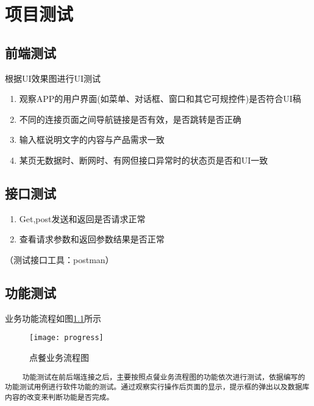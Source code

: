 
\chapter{项目测试}

\section{前端测试}

根据UI效果图进行UI测试
\begin{enumerate}
\item 观察APP的用户界面(如菜单、对话框、窗口和其它可规控件)是否符合UI稿
\item 不同的连接页面之间导航链接是否有效，是否跳转是否正确
\item 输入框说明文字的内容与产品需求一致
\item 某页无数据时、断网时、有网但接口异常时的状态页是否和UI一致
\end{enumerate}

\section{接口测试}
\begin{enumerate}
\item Get,post发送和返回是否请求正常
\item 查看请求参数和返回参数结果是否正常
\end{enumerate}
（测试接口工具：postman）

\section{功能测试}
业务功能流程如图\ref{fig:prog}所示
\begin{figure}[htbp]
    \centering
    \texttt{[image: progress]}
    \caption{点餐业务流程图}\label{fig:prog}
    \vspace{\baselineskip}
    \end{figure}

    
\begin{verbatim}
    功能测试在前后端连接之后，主要按照点餐业务流程图的功能依次进行测试，依据编写的功能测试用例进行软件功能的测试。通过观察实行操作后页面的显示，提示框的弹出以及数据库内容的改变来判断功能是否完成。
    
\end{verbatim}